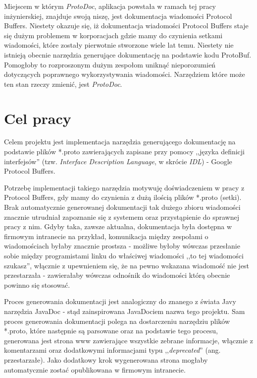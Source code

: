 \documentclass[pdflatex,11pt]{aghdpl}
\begin{document}
Miejscem w którym \textit{ProtoDoc}, aplikacja powstała w ramach tej pracy inżynierskiej, znajduje swoją niszę, jest dokumentacja wiadomości Protocol Buffers.
Niestety okazuje się, iż dokumentacja wiadomości Protocol Buffers staje się dużym problemem w korporacjach gdzie mamy do czynienia setkami wiadomości, które
zostały pierwotnie stworzone wiele lat temu. Niestety nie istnieją obecnie narzędzia generujące dokumentację na podstawie kodu ProtoBuf. Pomogłoby
to rozproszonym dużym zespołom uniknąć nieporozumień dotyczących poprawnego wykorzystywania wiadomości. Narzędziem które może ten stan rzeczy zmienić,
jest \textit{ProtoDoc}.


\section{Cel pracy}
\label{sec:celePracy}

Celem projektu jest implementacja narzędzia generującego dokumentację na podstawie plików 
*.proto zawierających zapisane przy pomocy ,,języka definicji interfejsów'' (tzw. \textit{Interface Description Language}, w skrócie \textit{IDL}) - Google Protocol Buffers. 


Potrzebę implementacji takiego narzędzia motywuję doświadczeniem w pracy z Protocol Buffers, gdy mamy do czynienia z dużą ilością plików *.proto (setki). 
Brak automatycznie generowanej dokumentacji tak dużego zbioru wiadomości znacznie utrudniał zapoznanie się z systemem oraz przystąpienie do sprawnej pracy z nim.
Gdyby taka, zawsze aktualna, dokumentacja była dostępna w firmowym intranecie na przykład, komunikacja między zespołami o wiadomościach byłaby znacznie prostsza - 
możliwe byłoby wówczas przesłanie sobie między programistami linku do właściwej wiadomości ,,to tej wiadomości szukasz'', włącznie z upewnieniem się, że na pewno
wskazana wiadomość nie jest przestarzała - zawierałaby wówczas odnośnik do wiadomości którą obecnie powinno się stosować.


Proces generowania dokumentacji jest analogiczny do znanego z świata Javy narzędzia JavaDoc \cite{JavaDoc} - stąd zainspirowana JavaDociem nazwa tego projektu. 
Sam proces generowania dokumentacji polega na dostarczeniu narzędziu plików *.proto, które następnie są parsowane oraz na podstawie tego procesu, 
generowana jest strona www zawierające wszystkie zebrane informacje, włącznie z komentarzami oraz dodatkowymi informacjami 
typu ,,\textit{deprecated}'' (ang. przestarzałe). Jako dodatkowy krok wygenerowana strona mogłaby automatycznie zostać opublikowana w firmowym intranecie.
\end{document}
